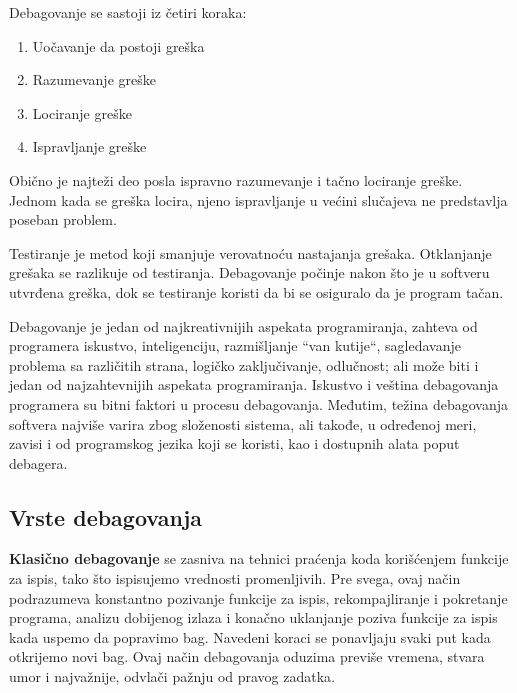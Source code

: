 \documentclass[a4paper]{article}
\begin{document}
\vspace{4mm}
Debagovanje se sastoji iz četiri koraka\cite{deb_app}:
\begin{enumerate}
\item Uočavanje da postoji greška
\item Razumevanje greške
\item Lociranje greške
\item Ispravljanje greške
\end{enumerate}

\vspace{4mm}

Obično je najteži deo posla ispravno razumevanje i tačno lociranje greške. Jednom kada 
se greška locira, njeno ispravljanje u većini slučajeva ne predstavlja poseban problem.

Testiranje je metod koji smanjuje verovatnoću nastajanja grešaka.
Otklanjanje grešaka se razlikuje od testiranja. Debagovanje počinje
nakon što je u softveru utvrđena greška, dok se testiranje koristi da bi
se osiguralo da je program tačan\cite{deb_app}.

Debagovanje je jedan od najkreativnijih aspekata programiranja, zahteva od programera iskustvo,
inteligenciju, razmišljanje ``van kutije``, sagledavanje problema sa različitih strana, logičko zaključivanje, odlučnost;  
ali može biti i jedan od najzahtevnijih aspekata programiranja.
Iskustvo i veština debagovanja programera su bitni faktori u procesu debagovanja. Međutim, težina 
debagovanja softvera najviše varira zbog složenosti sistema, ali takođe, u određenoj meri,
zavisi i od programskog jezika koji se koristi, kao i dostupnih alata poput debagera\cite{deb_app}.  


\subsection{Vrste debagovanja}
\label{subsec:vrste}

\textbf{Klasično debagovanje} se zasniva na tehnici praćenja koda korišćenjem funkcije za ispis, tako što 
ispisujemo vrednosti promenljivih. Pre svega, ovaj način podrazumeva konstantno pozivanje funkcije za 
ispis, rekompajliranje i pokretanje programa, analizu dobijenog izlaza i konačno uklanjanje 
poziva funkcije za ispis kada uspemo da popravimo bag. Navedeni koraci se ponavljaju svaki put 
kada otkrijemo novi bag. Ovaj način debagovanja oduzima previše vremena, stvara umor i najvažnije,
odvlači pažnju od pravog zadatka\cite{art_debugging}.
\end{document}

